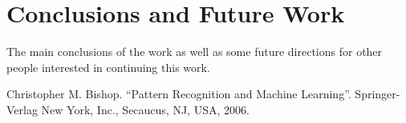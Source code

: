 \documentclass[conference]{IEEEtran}
\begin{document}
\section{Conclusions and Future Work}

The main conclusions of the work as well as some future directions for other people interested in continuing this work.

\begin{thebibliography}{00}
 Christopher M. Bishop. ``Pattern Recognition and Machine Learning''. Springer-Verlag New York, Inc., Secaucus, NJ, USA, 2006.
\end{thebibliography}
\end{document}
